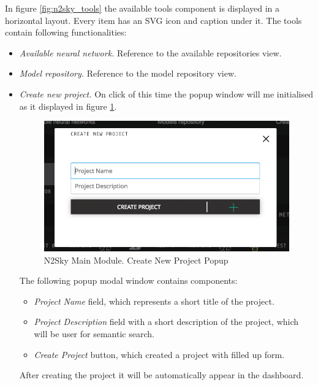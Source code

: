 In figure \ref{fig:n2sky_tools} the available tools component is displayed in a horizontal layout. Every item has an SVG icon and caption under it. The tools contain following functionalities: 
\begin{itemize}
\item \emph{Available neural network.} Reference to the available repositories view.  
\item \emph{Model repository.} Reference to the model repository view.
\item \emph{Create new project.} On click of this time the popup window will me initialised as it displayed in figure \ref{fig:popupcreatenewproject}.


\begin{figure}[htbp]
\begin{center}
  \includegraphics[scale=0.5]{components/5/img/popupcreatenewproject.png}
  \caption{N2Sky Main Module. Create New Project Popup}
  \label{fig:popupcreatenewproject}
\end{center}
\end{figure}


The following popup modal window contains components:
\begin{itemize}
\item \emph{Project Name} field, which represents a short title of the project.
\item \emph{Project Description} field with a short description of the project, which will be user for semantic search.  
\item \emph{Create Project} button, which created a project with filled up form.
\end{itemize}

After creating the project it will be automatically appear in the dashboard. 

\end{itemize}

